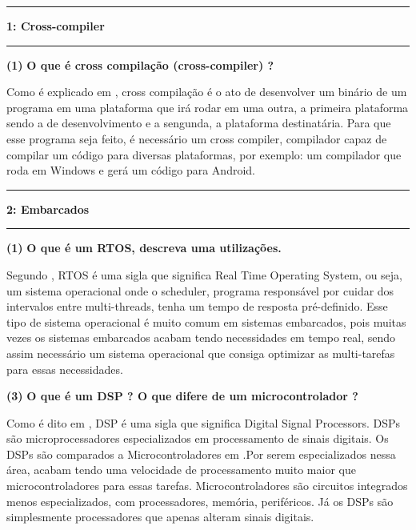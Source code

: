 \documentclass[11pt]{article}
\newcommand\question[2]{\vspace{.25in}\hrule\textbf{#1: #2}\vspace{.5em}\hrule\vspace{.10in}}
\renewcommand\part[1]{\vspace{.10in}\textbf{(#1)}}
\newcommand\crosscompiler{\vspace{.10in}\textbf{O que é cross compilação (cross-compiler) ? }}
\newcommand\rtos{\vspace{.10in}\textbf{O que é um RTOS, descreva uma utilizações. }}
\newcommand\dsp{\vspace{.10in}\textbf{O que é um DSP ? O que difere de um microcontrolador ? }}
\begin{document}
\raggedright
\newcommand\NAME{Marcelo G de Andrade}  %
\newcommand\HWNUM{1}              %


\question{1}{Cross-compiler}

\part{1} \crosscompiler


\RaggedRight Como é explicado em \cite{cross_compiler}, cross compilação é o ato de desenvolver um binário de um programa em uma plataforma que irá rodar em uma outra, a primeira plataforma sendo a de desenvolvimento e a sengunda, a plataforma destinatária. Para que esse programa seja feito, é necessário um cross compiler, compilador capaz de compilar um código para diversas plataformas, por exemplo: um compilador que roda em Windows e gerá um código para Android. 

\raggedright
\question{2}{Embarcados}

\part{1} \rtos

\RaggedRight
Segundo \cite{rtos}, RTOS é uma sigla que significa Real Time Operating System, ou seja, um sistema operacional onde o scheduler, programa responsável por cuidar dos intervalos entre multi-threads, tenha um tempo de resposta pré-definido. Esse tipo de sistema operacional é muito comum em sistemas embarcados, pois muitas vezes os sistemas embarcados acabam tendo necessidades em tempo real, sendo assim necessário um sistema operacional que consiga optimizar as multi-tarefas para
essas necessidades.

\raggedright
\part{3} \dsp

\RaggedRight
Como é dito em \cite{dsp}, DSP é uma sigla que significa Digital Signal Processors. DSPs são microprocessadores especializados em processamento de sinais digitais. Os DSPs são comparados a Microcontroladores em \cite{diffence_dsp}.Por serem especializados nessa área, acabam tendo uma velocidade de processamento muito maior que microcontroladores para essas tarefas. Microcontroladores são circuitos integrados menos especializados, com processadores, memória, periféricos. Já os DSPs são simplesmente processadores que  apenas alteram
sinais digitais.
\end{document}
